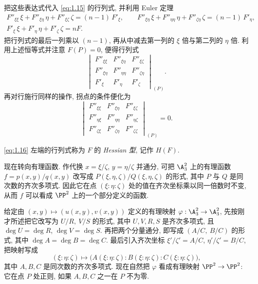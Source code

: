 把这些表达式代入 \eqref{eq:1.15} 的行列式, 并利用 Euler 定理
\begin{gather*}
	F''_{\xi\xi}\,\xi + F''_{\xi\eta}\,\eta + F''_{\xi\zeta}\,\zeta = (n-1)\, F'_\xi, \qquad
	F''_{\xi\eta}\,\xi + F''_{\eta\eta}\,\eta + F''_{\zeta\eta}\,\zeta = (n-1)\, F'_\eta, \\
	F'_\xi\,\xi + F'_\eta\,\eta + F'_\zeta\,\zeta = n F.
\end{gather*}
把行列式的最后一列乘以 $(n-1)$, 再从中减去第一列的 $\xi$ 倍与第二列的 $\eta$ 倍. 利用上述恒等式并注意 $F(P) = 0$, 便得行列式
\[
	\begin{vmatrix}
		F''_{\xi\xi} & F''_{\xi\eta} & F''_{\xi\zeta} \\
		F''_{\xi\eta} & F''_{\eta\eta} & F''_{\zeta\eta} \\
		F'_\xi       & F'_\eta       & F'_\zeta
	\end{vmatrix}_{(P)}.
\]
再对行施行同样的操作, 拐点的条件便化为
\begin{equation}
	\label{eq:1.16}
	\begin{vmatrix}
		F''_{\xi\xi} & F''_{\xi\eta} & F''_{\xi\zeta} \\
		F''_{\eta\xi} & F''_{\eta\eta} & F''_{\eta\zeta} \\
		F''_{\zeta\xi} & F''_{\zeta\eta} & F''_{\zeta\zeta}
	\end{vmatrix}_{(P)} = 0.
\end{equation}

\begin{definition}[Hessian 型]\label{def:hessian}
	\eqref{eq:1.16} 左端的行列式称为 $F$ 的 \emph{Hessian 型}, 记作 $H(F)$.
\end{definition}

现在转向有理函数. 作代换 $x = \xi/\zeta$, $y = \eta/\zeta$ 并通分, 可把 $\A^2_3$ 上的有理函数 $f = p(x,y)/q(x,y)$ 改写成 $P(\xi,\eta,\zeta)/Q(\xi,\eta,\zeta)$ 的形式, 其中 $P$ 与 $Q$ 是同次数的齐次多项式. 因此它在点 $(\xi : \eta : \zeta)$ 处的值在齐次坐标乘以同一倍数时不变, 从而 $f$ 可以看成 $\PP^2$ 上的一个部分定义的函数.

给定由 $(x, y) \mapsto (u(x,y), v(x,y))$ 定义的有理映射 $\varphi: \A^2_3 \to \A^2_3$, 先按刚才所述把它改写为 $U/R,\ V/S$ 的形式, 其中 $U, V, R, S$ 是齐次多项式, 且 $\deg U = \deg R$, $\deg V = \deg S$. 再把两个分量通分, 即写成 $(A/C,\ B/C)$ 的形式, 其中 $\deg A = \deg B = \deg C$. 最后引入齐次坐标 $\xi'/\zeta' = A/C$, $\eta'/\zeta' = B/C$, 把映射写成
\[
	(\xi : \eta : \zeta) \mapsto \bigl( A(\xi : \eta : \zeta) : B(\xi : \eta : \zeta) : C(\xi : \eta : \zeta) \bigr),
\]
其中 $A, B, C$ 是同次数的齐次多项式. 现在自然把 $\varphi$ 看成有理映射 $\PP^2 \to \PP^2$: 它在点 $P$ 处正则, 如果 $A, B, C$ 之一在 $P$ 不为零.

